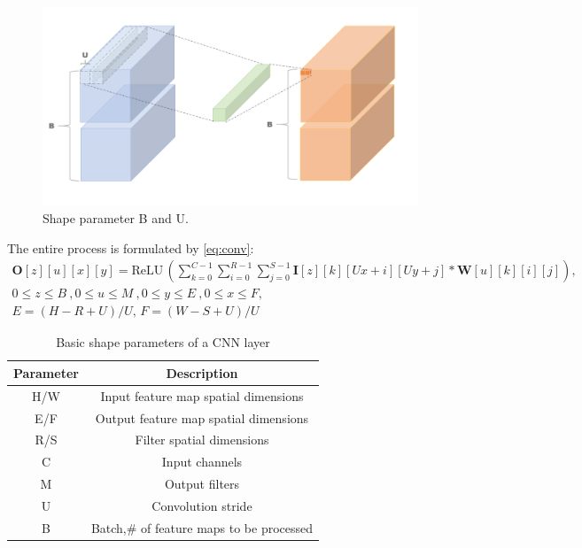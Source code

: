 \begin{figure}
    \centering
    \includegraphics[width=1\linewidth]{inc/3_low_numeric_convolution_neural_network/figure/convolution_2.png}
    \caption{Shape parameter B and U.}
    \label{fig:conv_2}
\end{figure}
The entire process is formulated by \autoref{eq:conv}:
\begin{equation}
    \begin{aligned}\label{eq:conv}
    \boldsymbol{O}[z][u][x][y]=\text{ReLU}\,(
        \sum^{C-1}_{k=0}\sum^{R-1}_{i=0}\sum^{S-1}_{j=0}\boldsymbol{I}[z][k][Ux+i][Uy+j]*\boldsymbol{W}[u][k][i][j]
    ), \\
    0\leq z\leq B\ , 0\leq u\leq M\ , 0\leq y\leq E\ , 0\leq x\leq F, \\
    E=(H-R+U)/U,\,F=(W-S+U)/U
    \end{aligned}
\end{equation}


\begin{table}
    \caption{Basic shape parameters of a CNN layer}
    \label{tab:cnn_shape}
    \centering
    \footnotesize 
        \begin{tabular}{cc}
        \toprule
        Parameter & Description \\
        \midrule
        H/W & Input feature map spatial dimensions\\
        E/F & Output feature map spatial dimensions\\
        R/S & Filter spatial dimensions\\
        C & Input channels\\
        M & Output filters\\
        U & Convolution stride\\
        B & Batch,\# of feature maps to be processed\\
        \bottomrule
        \end{tabular}
\end{table}


